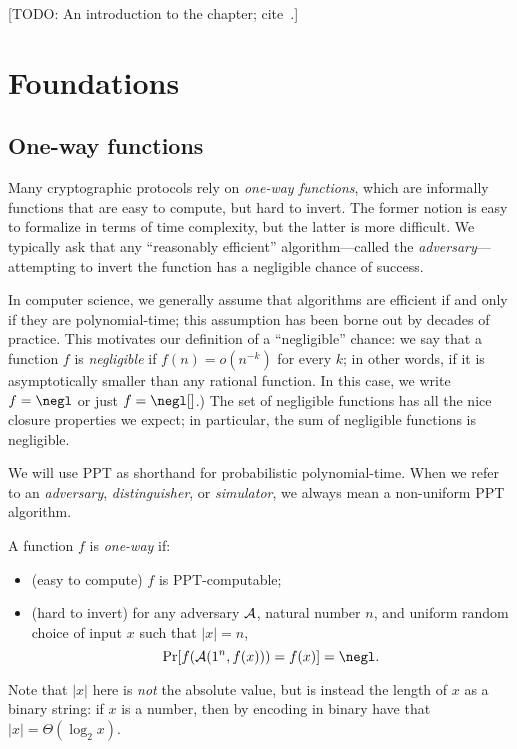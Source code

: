 [TODO: An introduction to the chapter;
cite~\cite{katz-lindell-2014, pass-shelat-2020, rosulek-2021}.]

\section{Foundations}

\subsection{One-way functions}

Many cryptographic protocols rely on \emph{one-way functions}, which are
informally functions that are easy to compute, but hard to invert. The former
notion is easy to formalize in terms of time complexity, but the latter is more
difficult. We typically ask that any ``reasonably efficient'' algorithm---called
the \emph{adversary}---attempting to invert the function has a negligible chance
of success.

In computer science, we generally assume that algorithms are efficient if and
only if they are polynomial-time; this assumption has been borne out by decades
of practice. This motivates our definition of a ``negligible'' chance: we say
that a function $f$ is \emph{negligible} if $f(n) = o(n^{-k})$
for every $k$; in other words, if it is asymptotically smaller than any rational
function. In this case, we write $f = \negl$ or just $f = \negl[]$.) The set
of negligible functions has all the nice closure properties we expect; in
particular, the sum of negligible functions is negligible.


\begin{ntn}
  We will use PPT as shorthand for probabilistic polynomial-time. When we refer
  to an \emph{adversary}, \emph{distinguisher}, or \emph{simulator}, we always
  mean a non-uniform PPT algorithm.
\end{ntn}

\begin{dfn}\label{def:one-way function}
  A function $f$ is \emph{one-way} if:
  \begin{itemize}
    \item (easy to compute) $f$ is PPT-computable;
    \item (hard to invert) for any adversary $\mathcal{A}$, natural number $n$, and
      uniform random choice of input $x$ such that $|x| = n$, \[
        \Pr[f(\cA(1^n, f(x))) = f(x)] = \negl.
      \]
  \end{itemize}
  Note that $|x|$ here is \emph{not} the absolute value, but is instead the
  length of $x$ as a binary string: if $x$ is a number, then by encoding in
  binary have that $|x| = \Theta(\log_2 x)$.
\end{dfn}

